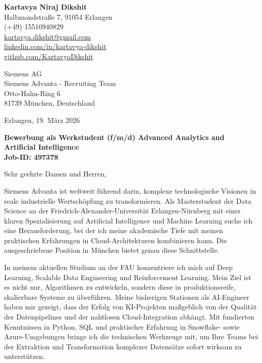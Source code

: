 \documentclass[10pt, a4paper]{article}
\begin{document}
\begin{flushright}
    \textbf{\large Kartavya Niraj Dikshit} \\
    \small
    Halbmondstraße 7, 91054 Erlangen \\
    (+49) 15510940829 \\
    \href{mailto:kartavya.dikshit@gmail.com}{kartavya.dikshit@gmail.com} \\
    \href{http://www.linkedin.com/in/kartavya-dikshit}{linkedin.com/in/kartavya-dikshit} \\
    \href{https://github.com/KartavyaDikshit}{github.com/KartavyaDikshit}
\end{flushright}

\vspace{20pt}

\begin{flushleft}
    Siemens AG \\
    Siemens Advanta - Recruiting Team \\
    Otto-Hahn-Ring 6 \\
    81739 München, Deutschland
\end{flushleft}

\vspace{20pt}

\begin{flushright}
    Erlangen, 19. März 2026
\end{flushright}

\vspace{10pt}
\textbf{\large Bewerbung als Werkstudent (f/m/d) Advanced Analytics and Artificial Intelligence} \\
\textbf{Job-ID: 497378}

\vspace{20pt}

Sehr geehrte Damen und Herren,

Siemens Advanta ist weltweit führend darin, komplexe technologische Visionen in reale industrielle Wertschöpfung zu transformieren. Als Masterstudent der Data Science an der Friedrich-Alexander-Universität Erlangen-Nürnberg mit einer klaren Spezialisierung auf Artificial Intelligence und Machine Learning suche ich eine Herausforderung, bei der ich meine akademische Tiefe mit meinen praktischen Erfahrungen in Cloud-Architekturen kombinieren kann. Die ausgeschriebene Position in München bietet genau diese Schnittstelle.

In meinem aktuellen Studium an der FAU konzentriere ich mich auf Deep Learning, Scalable Data Engineering und Reinforcement Learning. Mein Ziel ist es nicht nur, Algorithmen zu entwickeln, sondern diese in produktionsreife, skalierbare Systeme zu überführen. Meine bisherigen Stationen als AI-Engineer haben mir gezeigt, dass der Erfolg von KI-Projekten maßgeblich von der Qualität der Datenpipelines und der nahtlosen Cloud-Integration abhängt. Mit fundierten Kenntnissen in Python, SQL und praktischer Erfahrung in Snowflake- sowie Azure-Umgebungen bringe ich die technischen Werkzeuge mit, um Ihre Teams bei der Extraktion und Transformation komplexer Datensätze sofort wirksam zu unterstützen.
\end{document}

